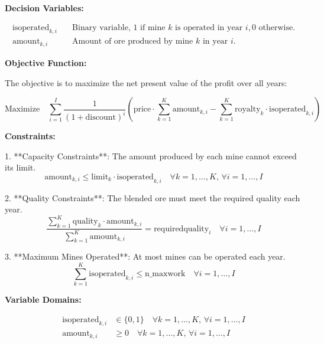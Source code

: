 \documentclass{article}
\begin{document}
\textbf{Decision Variables:}

\begin{align*}
\text{isoperated}_{k,i} & \quad \text{Binary variable, 1 if mine } k \text{ is operated in year } i, 0 \text{ otherwise.} \\
\text{amount}_{k,i} & \quad \text{Amount of ore produced by mine } k \text{ in year } i.
\end{align*}

\textbf{Objective Function:}

The objective is to maximize the net present value of the profit over all years:

\[
\text{Maximize} \quad \sum_{i=1}^{I} \frac{1}{(1+\text{discount})^{i}} \left( \text{price} \cdot \sum_{k=1}^{K} \text{amount}_{k,i} - \sum_{k=1}^{K} \text{royalty}_k \cdot \text{isoperated}_{k,i} \right)
\]

\textbf{Constraints:}

1. **Capacity Constraints**: The amount produced by each mine cannot exceed its limit.
   \[
   \text{amount}_{k,i} \leq \text{limit}_k \cdot \text{isoperated}_{k,i} \quad \forall k = 1, \ldots, K, \, \forall i = 1, \ldots, I
   \]

2. **Quality Constraints**: The blended ore must meet the required quality each year.
   \[
   \frac{\sum_{k=1}^{K} \text{quality}_k \cdot \text{amount}_{k,i}}{\sum_{k=1}^{K} \text{amount}_{k,i}} = \text{requiredquality}_i \quad \forall i = 1, \ldots, I
   \]

3. **Maximum Mines Operated**: At most  mines can be operated each year.
   \[
   \sum_{k=1}^{K} \text{isoperated}_{k,i} \leq \text{n\_maxwork} \quad \forall i = 1, \ldots, I
   \]

\textbf{Variable Domains:}

\begin{align*}
\text{isoperated}_{k,i} & \in \{0, 1\} \quad \forall k = 1, \ldots, K, \, \forall i = 1, \ldots, I \\
\text{amount}_{k,i} & \geq 0 \quad \forall k = 1, \ldots, K, \, \forall i = 1, \ldots, I
\end{align*}
\end{document}
